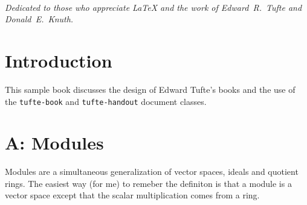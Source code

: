 \documentclass{tufte-book} %
\theoremstyle{definition}
\theoremstyle{theorem}
\theoremstyle{proposition}
\theoremstyle{lemma}
\theoremstyle{corolarry}
\newcommand{\doccls}[1]{\texttt{#1}}
\begin{document}

\tableofcontents %


\listoffigures %


\listoftables %


\cleardoublepage
~\vfill
\begin{doublespace}
\noindent\fontsize{18}{22}\selectfont\itshape
\nohyphenation
Dedicated to those who appreciate \LaTeX{} and the work of \mbox{Edward R.~Tufte} and \mbox{Donald E.~Knuth}.
\end{doublespace}
\vfill
\vfill


\cleardoublepage
\chapter*{Introduction} %

This sample book discusses the design of Edward Tufte's books\cite{Tufte2001,Tufte1990,Tufte1997,Tufte2006} and the use of the \doccls{tufte-book} and \doccls{tufte-handout} document classes.


\mainmatter


\chapter{A: Modules}

Modules are a simultaneous generalization of vector spaces, ideals and quotient rings.
The easiest way (for me) to remeber the definiton is that a module is a vector space except that the scalar multiplication comes from a ring.
\end{document}
